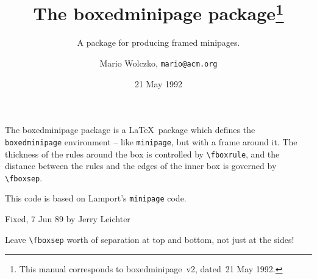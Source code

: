 \documentclass[DIV=9, pagesize=auto, version=last]{scrartcl}
\title{The \textsf{boxedminipage} package\thanks{This manual corresponds to \textsf{boxedminipage}~v2, dated~21 May 1992.}}
\subtitle{A package for producing framed minipages.}
\author{Mario Wolczko, \texttt{mario@acm.org}}
\date{21 May 1992}
\begin{document}
\maketitle

\noindent
The \textsf{boxedminipage} package is a \LaTeX\ package which defines the \texttt{boxedminipage} environment -- like \texttt{minipage}, but with a frame around it.
The thickness of the rules around the box is controlled by
\verb+\fboxrule+, and the distance between the rules and the edges of the
inner box is governed by \verb+\fboxsep+.

This code is based on Lamport's \texttt{minipage} code.


%
\begin{labeling}[\hspace{\labelsep}--]{Fixed, 7 Jun 89 by Jerry Leichter}
\item[Fixed, 7 Jun 89 by Jerry Leichter]
  Leave \verb+\fboxsep+ worth of separation at top and bottom, not just at
  the sides!
\end{labeling}
\end{document}
